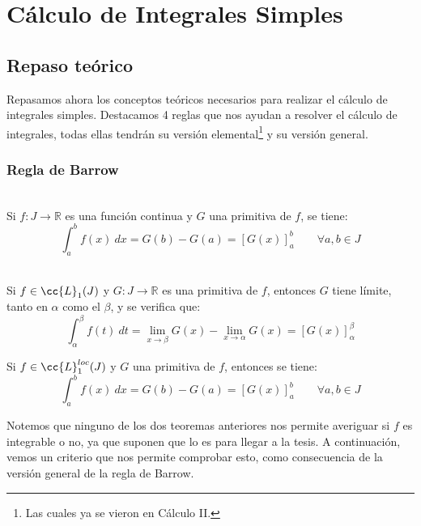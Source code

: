 \section{Cálculo de Integrales Simples}

\subsection{Repaso teórico}
Repasamos ahora los conceptos teóricos necesarios para realizar el cálculo de integrales simples. Destacamos 4 reglas que nos ayudan a resolver el cálculo de integrales, todas ellas tendrán su versión elemental\footnote{Las cuales ya se vieron en Cálculo II.} y su versión general.

\subsubsection{Regla de Barrow}
\begin{teo}\ \\
    Si $f:J\rightarrow\mathbb{R}$ es una función continua y $G$ una primitiva de $f$, se tiene:
    \begin{equation*}
        \int_{a}^{b} f(x)~dx  = G(b) - G(a) = {[G(x)]}_a^b\qquad \forall a,b\in J
    \end{equation*}
\end{teo}

\begin{teo}\ \\
    Si $f\in \cc{L}_1(J)$ y $G:J\rightarrow\mathbb{R}$ es una primitiva de $f$, entonces $G$ tiene límite, tanto en $\alpha$ como el $\beta$, y se verifica que:
    \begin{equation*}
        \displaystyle\int_{\alpha}^{\beta} f(t)~dt = \lim_{x\to\beta} G(x) -\lim_{x\to\alpha} G(x) = {[G(x)]}_\alpha^\beta
    \end{equation*}
\end{teo}
\begin{coro}
    Si $f\in \cc{L}_1^{loc}(J)$ y $G$ una primitiva de $f$, entonces se tiene:
    \begin{equation*}
        \int_{a}^{b} f(x)~dx  = G(b) - G(a) = {[G(x)]}_a^b\qquad \forall a,b\in J
    \end{equation*}
\end{coro}
Notemos que ninguno de los dos teoremas anteriores nos permite averiguar si $f$ es integrable o no, ya que suponen que lo es para llegar a la tesis. A continuación, vemos un criterio que nos permite comprobar esto, como consecuencia de la versión general de la regla de Barrow.

